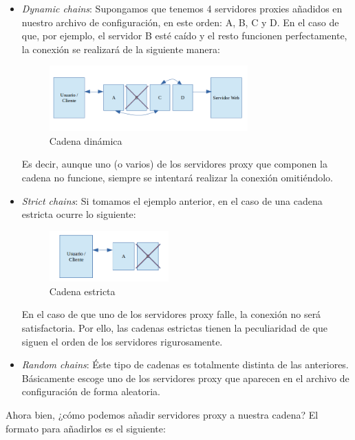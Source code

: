 \begin{itemize}
	\item \textit{Dynamic chains}: Supongamos que tenemos 4 servidores proxies añadidos en nuestro archivo de configuración, en este orden: A, B, C y D.
	En el caso de que, por ejemplo, el servidor B esté caído y el resto funcionen perfectamente, la conexión se realizará de la siguiente manera:
	
	\begin{figure}[h]
		\centerline{
			\mbox{\includegraphics[width=3.00in]{images/proxy_dynamic.png}}
		}
		\caption{Cadena dinámica}
		\label{fig:norm_Daugman}
	\end{figure}
		
	Es decir, aunque uno (o varios) de los servidores proxy que componen la cadena no funcione, siempre se intentará realizar la conexión omitiéndolo.
	
	\item \textit{Strict chains}: Si tomamos el ejemplo anterior, en el caso de una cadena estricta ocurre lo siguiente:
	
	\begin{figure}[h]
		\centerline{
			\mbox{\includegraphics[width=1.80in]{images/proxy_strict.png}}
		}
		\caption{Cadena estricta}
		\label{fig:norm_Daugman}
	\end{figure}
			
	En el caso de que uno de los servidores proxy falle, la
        conexión no será satisfactoria. Por ello, las cadenas
        estrictas tienen la peculiaridad de que siguen el orden de los
        servidores rigurosamente.
	
      \item \textit{Random chains}: Éste tipo de cadenas es totalmente
        distinta de las anteriores. Básicamente escoge uno de los
        servidores proxy que aparecen en el archivo de configuración
        de forma aleatoria.
\end{itemize}

Ahora bien, ¿cómo podemos añadir servidores proxy a nuestra cadena?
El formato para añadirlos es el siguiente:


